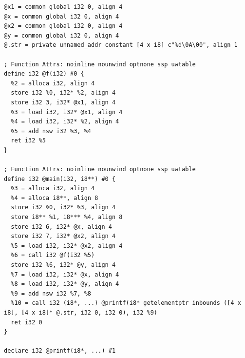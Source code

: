 \documentclass{jarticle}
\begin{document}
\begin{minipage}{0.5\textwidth}
\begin{lstlisting}[frame=single,framerule=0pt]
@x1 = common global i32 0, align 4
@x = common global i32 0, align 4
@x2 = common global i32 0, align 4
@y = common global i32 0, align 4
@.str = private unnamed_addr constant [4 x i8] c"%d\0A\00", align 1

; Function Attrs: noinline nounwind optnone ssp uwtable
define i32 @f(i32) #0 {
  %2 = alloca i32, align 4
  store i32 %0, i32* %2, align 4
  store i32 3, i32* @x1, align 4
  %3 = load i32, i32* @x1, align 4
  %4 = load i32, i32* %2, align 4
  %5 = add nsw i32 %3, %4
  ret i32 %5
}

; Function Attrs: noinline nounwind optnone ssp uwtable
define i32 @main(i32, i8**) #0 {
  %3 = alloca i32, align 4
  %4 = alloca i8**, align 8
  store i32 %0, i32* %3, align 4
  store i8** %1, i8*** %4, align 8
  store i32 6, i32* @x, align 4
  store i32 7, i32* @x2, align 4
  %5 = load i32, i32* @x2, align 4
  %6 = call i32 @f(i32 %5)
  store i32 %6, i32* @y, align 4
  %7 = load i32, i32* @x, align 4
  %8 = load i32, i32* @y, align 4
  %9 = add nsw i32 %7, %8
  %10 = call i32 (i8*, ...) @printf(i8* getelementptr inbounds ([4 x i8], [4 x i8]* @.str, i32 0, i32 0), i32 %9)
  ret i32 0
}

declare i32 @printf(i8*, ...) #1
\end{lstlisting}
\end{minipage}
\end{document}
